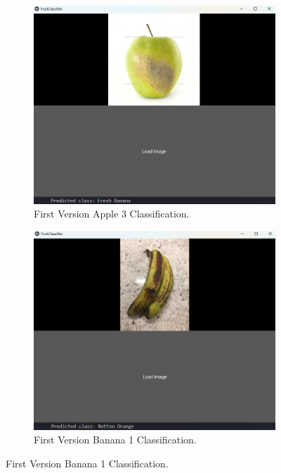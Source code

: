 \documentclass[conference]{IEEEtran}
\begin{document}
\begin{figure}[h]
\begin{subfigure}[b]{0.48\linewidth}
        \label{figFB}
    \end{subfigure}
    \hfill
    \begin{subfigure}[b]{0.48\linewidth}
        \centering
        \includegraphics[width=\linewidth]{1layer appelR3.png}
        \caption{First Version Apple 3 Classification.}
        \label{figFB}
    \end{subfigure}
    \hfill
    \begin{subfigure}[b]{0.48\linewidth}
        \centering
        \includegraphics[width=\linewidth]{1layer bananaR1.png}
        \caption{First Version Banana 1 Classification.}

\end{subfigure}
\end{figure}
\end{document}

